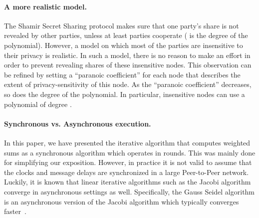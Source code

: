 \documentclass[10pt]{svjour3}
\begin{document}
\paragraph{A more realistic model.}
The Shamir Secret Sharing protocol makes sure that one party's share
is not revealed by other parties, unless at least  parties
cooperate ( is the degree of the polynomial). However, a model on
which most of the parties are insensitive to their privacy is
realistic. In such a model, there is no reason to make an effort in
order to prevent revealing shares of these insensitive nodes. This
observation can be refined by setting a ``paranoic coefficient'' for
each node that describes the extent of privacy-sensitivity of this
node. As the ``paranoic coefficient'' decreases, so does the degree of
the polynomial. In particular, insensitive nodes can use a polynomial
of degree .



\paragraph{Synchronous vs. Asynchronous execution.}
In this paper, we have presented the iterative algorithm that computes
weighted sums as a synchronous algorithm which operates in rounds.
This was mainly done for simplifying our exposition.
However, in practice it is not  valid to assume  that the clocks and message delays are synchronized in
a large Peer-to-Peer network. Luckily, it is known that linear
iterative algorithms such as the Jacobi algorithm
converge in asynchronous settings as well. Specifically, the Gauss Seidel algorithm
is an asynchronous version of the Jacobi algorithm which typically converges faster~\cite{BibDB:BookBertsekasTsitsiklis}.
\end{document}
